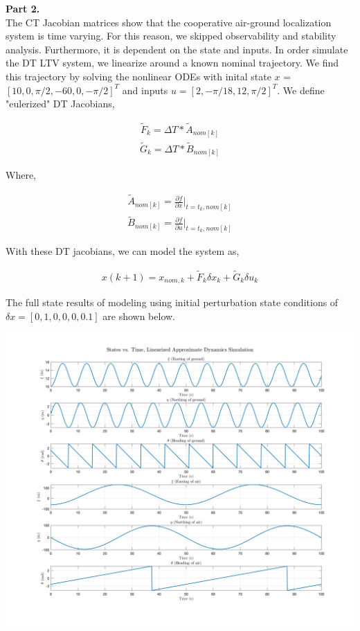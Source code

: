 \documentclass[paper=a4, fontsize=11pt]{scrartcl} %
\numberwithin{equation}{section} %
\numberwithin{figure}{section} %
\numberwithin{table}{section} %
\begin{document}
\begin{framed}
\textbf{Part 2.} \\

The CT Jacobian matrices show that the cooperative air-ground localization system is time varying. For this reason, we skipped observability and stability analysis. Furthermore, it is dependent on the state and inputs. In order simulate the DT LTV system, we linearize around a known nominal trajectory. We find this trajectory by solving the nonlinear ODEs with inital state \(x\) = \([10, 0, \pi/2, -60, 0, -\pi/2]^{T}\) and inputs \(u = [2, -\pi/18, 12, \pi/2]^{T}\). We define "eulerized" DT Jacobians,

\begin{align*}
    \tilde{F}_{k} = \Delta T * \tilde{A}_{nom[k]}
\end{align*}
\begin{align*}
    \tilde{G}_{k} = \Delta T * \tilde{B}_{nom[k]}
\end{align*}

Where,

\begin{align*}
    \tilde{A}_{nom[k]} = \frac{\partial f}{\partial x} \Big|_{t = t_{k}, nom[k]}
\end{align*}
\begin{align*}
    \tilde{B}_{nom[k]} = \frac{\partial f}{\partial u} \Big|_{t = t_{k}, nom[k]}
\end{align*}

With these DT jacobians, we can model the system as,

\begin{align*}
    x(k + 1) = x_{nom, k} + \tilde{F}_{k} \delta x_{k} + \tilde{G}_{k} \delta u_{k}
\end{align*}

The full state results of modeling using initial perturbation state conditions of \(\delta x = [0, 1, 0, 0, 0, 0.1]\) are shown below.

\includegraphics[scale=0.2]{LinearizedFullStateDynamics.png}


\end{framed}
\end{document}
